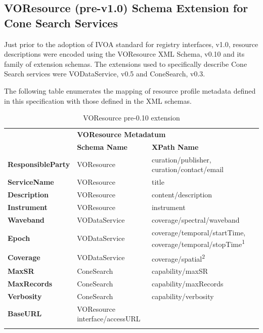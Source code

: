 \documentclass[11pt,a4paper]{ivoa}
\begin{document}
\subsection{VOResource (pre-v1.0) Schema Extension for Cone Search Services} 

Just prior to the adoption of IVOA standard for registry
interfaces, v1.0, resource descriptions were encoded using the
VOResource XML Schema, v0.10 and its family of extension schemas. The
extensions used to specifically describe Cone Search services were
VODataService, v0.5 and ConeSearch, v0.3.

The following table enumerates the mapping of resource profile metadata
defined in this specification with those defined in the XML schemas.

\begin{table}[th]
\begin{tabular}{p{}p{}p{}}
\sptablerule
\multirow{2}{*}{\textbf{Cone Search Metadatum}}&\multicolumn{2}{p{0.59\textwidth}}{\textbf{VOResource Metadatum}}\\
&\textbf{Schema Name}&\textbf{XPath Name}\\ 
\sptablerule
\textbf{ResponsibleParty} & VOResource & curation/publisher, curation/contact/email\\
\textbf{ServiceName} & VOResource & title\\
\textbf{Description} & VOResource & content/description\\
\textbf{Instrument} & VOResource & instrument\\
\textbf{Waveband} & VODataService & coverage/spectral/waveband\\
\textbf{Epoch} & VODataService & coverage/temporal/startTime, coverage/temporal/stopTime\textsuperscript{1}\\
\textbf{Coverage} & VODataService & coverage/spatial\textsuperscript{2}\\
\textbf{MaxSR} & ConeSearch & capability/maxSR\\
\textbf{MaxRecords} & ConeSearch & capability/maxRecords\\
\textbf{Verbosity} & ConeSearch &capability/verbosity\\
\textbf{BaseURL} & VOResource interface/accessURL\\
\sptablerule
\label{table:extable}
\end{tabular}
\caption{VOResource pre-0.10 extension}
\end{table} 
\end{document}
